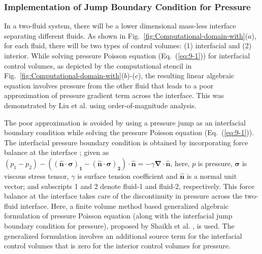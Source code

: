 \documentclass[preprint,12pt]{elsarticle}
\begin{document}
\subsubsection{Implementation of Jump Boundary Condition for Pressure\label{sub:Implementation-of-Jump}}

In a two-fluid system, there will be a lower dimensional mass-less
interface separating different fluids. As shown in Fig.~\ref{fig:Computational-domain-with}($a$),
for each fluid, there will be two types of control volumes: (1) interfacial
and (2) interior. While solving pressure Poisson equation (Eq.~(\ref{eq:9-1}))
for interfacial control volumes, as depicted by the computational
stencil in Fig.~\ref{fig:Computational-domain-with}($b$)-($c$), the resulting
linear algebraic equation involves pressure from the other fluid that
leads to a poor approximation of pressure gradient term across the
interface. This was demonstrated by Liu et al. \cite{liu2000} using
order-of-magnitude analysis.

The poor approximation is avoided by using a pressure jump as an interfacial
boundary condition \cite{liu2000} while solving the pressure Poisson
equation (Eq.~(\ref{eq:9-1})).  The interfacial pressure boundary
condition is obtained by incorporating force balance at the interface \cite{shaikh2018};
given as  ${(p_{1}-p_{2})-\mathbf{((\hat{n}\cdot\sigma)_{1}-(\hat{n}\cdot\sigma)_{2})\cdot\hat{n}}=-\gamma\mathbf{\nabla\cdot\hat{n}}}$,
here, $p$ is pressure, $\mathbf{\sigma}$ is viscous stress tensor, $\gamma$ is
surface tension coefficient and $\mathbf{\hat{n}}$ is a normal unit vector;
and subscripts 1 and 2 denote fluid-1 and fluid-2, respectively. This
force balance at the interface  takes care of the discontinuity in
pressure across the two-fluid interface.  Here, a finite volume method
based generalized algebraic formulation of pressure Poisson equation
(along with the interfacial jump boundary condition for pressure),
proposed by Shaikh et al. \cite{shaikh2018}, is used. The generalized
formulation involves an additional source term for the interfacial
control volumes that is zero for the interior control volumes for
pressure.















\begin{center}

\par\end{center}
\end{document}

